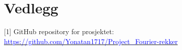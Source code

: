 \section*{Vedlegg}\label{vedlegg}
[1] GitHub repository for prosjektet: \href{https://github.com/Yonatan1717/Project_Fourier-rekker}{\textcolor{blue}{https://github.com/Yonatan1717/Project\_Fourier-rekker}}